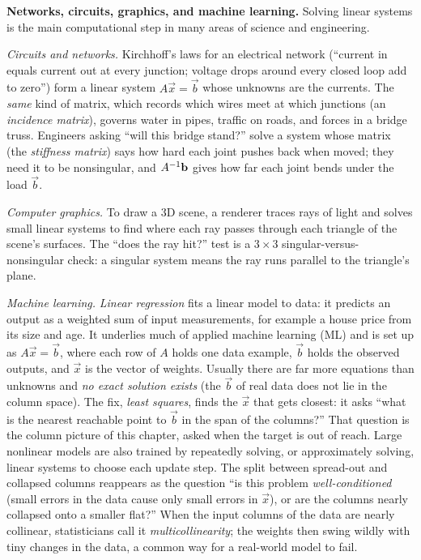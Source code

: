 \begin{applicationbox}
\textbf{Networks, circuits, graphics, and machine learning.}
Solving linear systems is the main computational step in
many areas of science and engineering.

\emph{Circuits and networks.} Kirchhoff's laws for an electrical network
(``current in equals current out at every junction; voltage drops around
every closed loop add to zero'') form a linear system $A\vec x=\vec b$ whose
unknowns are the currents. The \emph{same} kind of matrix, which records
which wires meet at which junctions (an \emph{incidence matrix}), governs
water in pipes, traffic on roads, and forces in a bridge truss. Engineers
asking ``will this bridge stand?'' solve a system whose matrix (the
\emph{stiffness matrix}) says how hard each joint pushes back when moved;
they need it to be nonsingular, and $A^{-1}\mathbf{b}$ gives how far each joint
bends under the load $\vec b$.

\emph{Computer graphics.} To draw a 3D scene, a renderer traces rays of
light and solves small linear systems to find where each ray passes through
each triangle of the scene's surfaces. The ``does the ray hit?'' test is a
$3\times3$ singular-versus-nonsingular check: a singular system means the
ray runs parallel to the triangle's plane.

\emph{Machine learning.} \emph{Linear regression} fits a linear model to
data: it predicts an output as a weighted sum of input measurements, for
example a house price from its size and age. It underlies much of applied
machine learning (ML) and is set up as $A\vec x=\vec b$, where each row of
$A$ holds one data example, $\vec b$ holds the observed outputs, and $\vec x$
is the vector of weights. Usually
there are far more equations than unknowns and \emph{no exact solution
exists} (the $\vec b$ of real data does not lie in the column space). The
fix, \emph{least squares}, finds the $\vec x$ that gets closest: it asks
``what is the nearest reachable point to $\vec b$ in the span of the
columns?'' That question is the column picture of this chapter, asked when
the target is out of reach. Large nonlinear models are also trained by
repeatedly solving, or approximately solving, linear systems to choose each
update step. The split between spread-out and collapsed columns reappears
as the question ``is this problem \emph{well-conditioned} (small errors in
the data cause only small errors in $\vec x$), or are the columns nearly
collapsed onto a smaller flat?'' When the input columns of the data are
nearly collinear, statisticians call it \emph{multicollinearity}; the
weights then swing wildly with tiny changes in the data, a common way for a
real-world model to fail.
\end{applicationbox}

